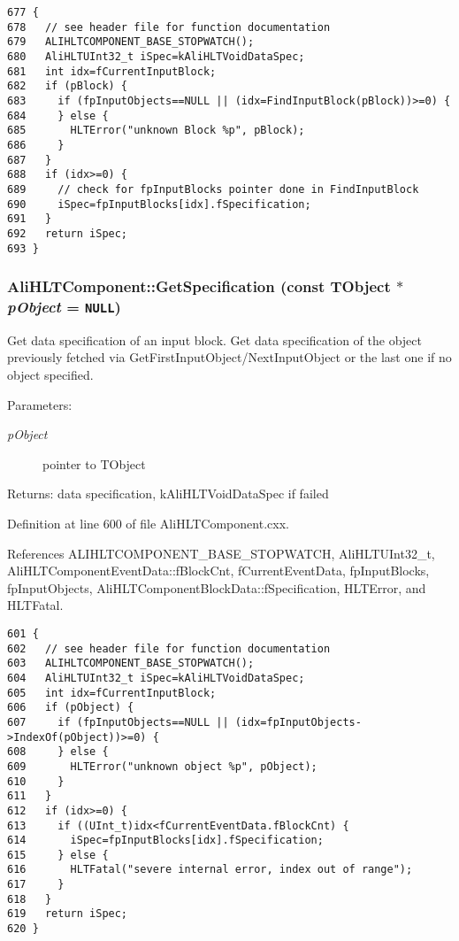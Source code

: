 \footnotesize\begin{verbatim}677 {
678   // see header file for function documentation
679   ALIHLTCOMPONENT_BASE_STOPWATCH();
680   AliHLTUInt32_t iSpec=kAliHLTVoidDataSpec;
681   int idx=fCurrentInputBlock;
682   if (pBlock) {
683     if (fpInputObjects==NULL || (idx=FindInputBlock(pBlock))>=0) {
684     } else {
685       HLTError("unknown Block %p", pBlock);
686     }
687   }
688   if (idx>=0) {
689     // check for fpInputBlocks pointer done in FindInputBlock
690     iSpec=fpInputBlocks[idx].fSpecification;
691   }
692   return iSpec;
693 }
\end{verbatim}\normalsize 


\subsubsection{ Ali\-HLTComponent::Get\-Specification (const TObject $\ast$ {\em p\-Object} = {\tt NULL})\hspace{0.3cm}{\tt  [protected]}}\label{classAliHLTComponent_b17}


Get data specification of an input block. Get data specification of the object previously fetched via Get\-First\-Input\-Object/Next\-Input\-Object or the last one if no object specified. \begin{Desc}
\item[Parameters:]
\begin{description}
\item[{\em p\-Object}]pointer to TObject \end{description}
\end{Desc}
\begin{Desc}
\item[Returns:]data specification, k\-Ali\-HLTVoid\-Data\-Spec if failed \end{Desc}


Definition at line 600 of file Ali\-HLTComponent.cxx.

References ALIHLTCOMPONENT\_\-BASE\_\-STOPWATCH, Ali\-HLTUInt32\_\-t, Ali\-HLTComponent\-Event\-Data::f\-Block\-Cnt, f\-Current\-Event\-Data, fp\-Input\-Blocks, fp\-Input\-Objects, Ali\-HLTComponent\-Block\-Data::f\-Specification, HLTError, and HLTFatal.

\footnotesize\begin{verbatim}601 {
602   // see header file for function documentation
603   ALIHLTCOMPONENT_BASE_STOPWATCH();
604   AliHLTUInt32_t iSpec=kAliHLTVoidDataSpec;
605   int idx=fCurrentInputBlock;
606   if (pObject) {
607     if (fpInputObjects==NULL || (idx=fpInputObjects->IndexOf(pObject))>=0) {
608     } else {
609       HLTError("unknown object %p", pObject);
610     }
611   }
612   if (idx>=0) {
613     if ((UInt_t)idx<fCurrentEventData.fBlockCnt) {
614       iSpec=fpInputBlocks[idx].fSpecification;
615     } else {
616       HLTFatal("severe internal error, index out of range");
617     }
618   }
619   return iSpec;
620 }
\end{verbatim}\normalsize 


